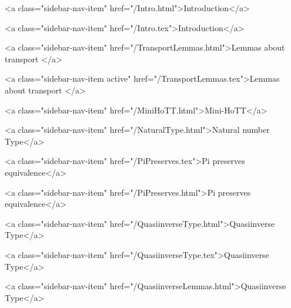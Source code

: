       
    
      
        
          <a class="sidebar-nav-item" href="/Intro.html">Introduction</a>
        
      
    
      
        
          <a class="sidebar-nav-item" href="/Intro.tex">Introduction</a>
        
      
    
      
        
          <a class="sidebar-nav-item" href="/TransportLemmas.html">Lemmas about transport </a>
        
      
    
      
        
          <a class="sidebar-nav-item active" href="/TransportLemmas.tex">Lemmas about transport </a>
        
      
    
      
        
          <a class="sidebar-nav-item" href="/MiniHoTT.html">Mini-HoTT</a>
        
      
    
      
        
          <a class="sidebar-nav-item" href="/NaturalType.html">Natural number Type</a>
        
      
    
      
        
          <a class="sidebar-nav-item" href="/PiPreserves.tex">Pi preserves equivalence</a>
        
      
    
      
        
          <a class="sidebar-nav-item" href="/PiPreserves.html">Pi preserves equivalence</a>
        
      
    
      
        
          <a class="sidebar-nav-item" href="/QuasiinverseType.html">Quasiinverse Type</a>
        
      
    
      
        
          <a class="sidebar-nav-item" href="/QuasiinverseType.tex">Quasiinverse Type</a>
        
      
    
      
        
          <a class="sidebar-nav-item" href="/QuasiinverseLemmas.html">Quasiinverse Type</a>
        
